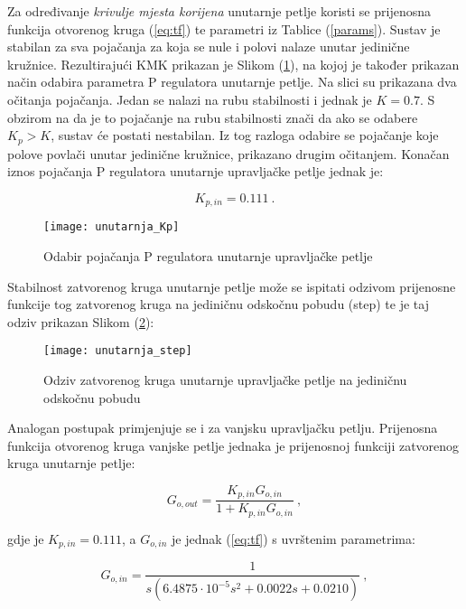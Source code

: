 \documentclass[11pt,a4paper]{article}
\begin{document}
\medskip

Za određivanje \textit{krivulje mjesta korijena} unutarnje petlje koristi se prijenosna funkcija otvorenog kruga (\ref{eq:tf}) te parametri iz Tablice (\ref{params}). Sustav je stabilan za sva pojačanja za koja se nule i polovi nalaze unutar jedinične kružnice.  Rezultirajući KMK prikazan je Slikom (\ref{fig:unutarnja_Kp}), na kojoj je također prikazan način odabira parametra P regulatora unutarnje petlje. Na slici su prikazana dva očitanja pojačanja. Jedan se nalazi na rubu stabilnosti i jednak je $K= 0.7$. S obzirom na da je to pojačanje na rubu stabilnosti znači da ako se odabere $K_{p} > K$, sustav će postati nestabilan. Iz tog razloga odabire se pojačanje koje polove povlači unutar jedinične kružnice, prikazano drugim očitanjem. Konačan iznos pojačanja P regulatora unutarnje upravljačke petlje jednak je:

 \begin{equation}
 \boxed{
 K_{p,in} = 0.111
 } \ .
 \label{eq:Kp_in}
 \end{equation}


\begin{figure}[H]
	\centering
	\texttt{[image: unutarnja\_Kp]}
	\caption{Odabir pojačanja P regulatora unutarnje upravljačke petlje}
	\label{fig:unutarnja_Kp}
\end{figure}

Stabilnost zatvorenog kruga unutarnje petlje može se ispitati odzivom prijenosne funkcije tog zatvorenog kruga na jediničnu odskočnu pobudu (step) te je taj odziv prikazan Slikom (\ref{fig:step1}):

\begin{figure}[H]
	\centering
	\texttt{[image: unutarnja\_step]}
	\caption{Odziv zatvorenog kruga unutarnje upravljačke petlje na jediničnu odskočnu pobudu}
	\label{fig:step1}
\end{figure}


Analogan postupak primjenjuje se i za vanjsku upravljačku petlju. Prijenosna funkcija otvorenog kruga vanjske petlje jednaka je prijenosnoj funkciji zatvorenog kruga unutarnje petlje:

\begin{equation}
G_{o,out} = \frac{K_{p,in}G_{o,in}}{1 + K_{p,in}G_{o,in}} \ ,
\label{eq:tf2}
\end{equation}

gdje je $K_{p,in} = 0.111$, a $G_{o,in}$  je jednak (\ref{eq:tf}) s uvrštenim parametrima:


\begin{equation}
G_{o,in} = \frac{1}{s(6.4875\cdot10^{-5}s^{2} + 0.0022s  + 0.0210)} \ ,
\label{eq:Goin}
\end{equation}
\end{document}
